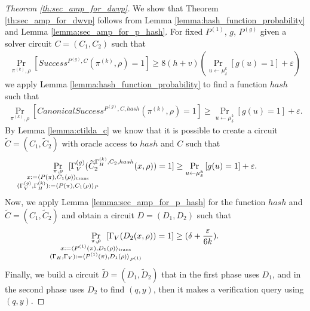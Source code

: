 \begin{proof}[Theorem \ref{th:sec_amp_for_dwvp}]
We show that Theorem \ref{th:sec_amp_for_dwvp} follows from Lemma \ref{lemma:hash_function_probability} and Lemma \ref{lemma:sec_amp_for_p_hash}.
For fixed $P^{(1)}$, $g$, $P^{(g)}$ given a solver circuit $C = (C_1, C_2)$ such that
\begin{align*}
    \underset{\pi^{(k)}, \rho}{\Pr}\left[Success^{P^{(g)}, C}(\pi^{(k)}, \rho) = 1\right] \geq 8(h+v)\left(\underset{u \leftarrow \mu_\delta^k}{\Pr}\left[g(u) = 1\right] + \varepsilon\right)
\end{align*}
we apply Lemma \ref{lemma:hash_function_probability} to find a function $hash$ such that
\begin{align*}
    \underset{\pi^{(k)}, \rho}{\Pr}\left[CanonicalSuccess^{P^{(g)}, C, hash}(\pi^{(k)}, \rho) = 1\right] \geq \underset{u \leftarrow \mu_\delta^k}{\Pr}\left[g(u) = 1\right] + \varepsilon.
\end{align*}
By Lemma \ref{lemma:ctilda_c} we know that it is possible to create a circuit $\widetilde{C} = (C_1, \widetilde{C}_2)$ with oracle access to $hash$ and $C$ such that
\begin{align*}
    \underset{
      \mathclap {
      \substack{\pi, \rho \\
        x := \langle P(\pi), C_1(\rho) \rangle_{\text{trans}} \\
        (\Gamma_V^{(g)}, \Gamma_H^{(k)}) := \langle P(\pi), C_1(\rho) \rangle_{P}
      }}}
    {\Pr}\mkern13mu[\Gamma_V^{(g)}(\widetilde{C}_2^{\Gamma_H^{(k)}, C_2, hash}(x, \rho)) = 1]
    \geq
\underset{u \leftarrow \mu_\delta^k}{\Pr}\left[g(u) = 1\right] + \varepsilon.
\end{align*}
Now, we apply Lemma \ref{lemma:sec_amp_for_p_hash} for the function $hash$ and $\widetilde{C} = (C_1, \widetilde{C}_2)$ and obtain a circuit $D = (D_1, D_2)$ such that
\begin{align}
  \label{eq:succ_prob_d}
    \underset{
      \mathclap{
      \substack{\pi, \rho \\ x := \langle P^{(1)}(\pi), D_1(\rho) \rangle_{\text{trans}} \\
        (\Gamma_H, \Gamma_V) := \langle P^{(1)}(\pi), D_1(\rho) \rangle_{P^{(1)}}}}}
    {\Pr}\mkern13mu[\Gamma_V(D_2(x, \rho)) = 1] \geq (\delta + \frac{\varepsilon}{6k}).
\end{align}
Finally, we build a circuit $\widetilde{D} = (D_1, \widetilde{D}_2)$ that in the first phase uses $D_1$, and in the second phase
uses $D_2$ to find $(q,y)$, then it makes a verification query using $(q,y)$.

\end{proof}

